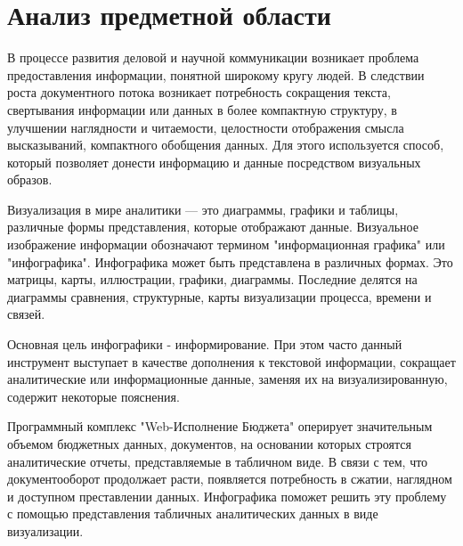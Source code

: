 \documentclass[a4paper]{extarticle}
\numberwithin{equation}{section}
\begin{document}
\newpage
\section{Анализ предметной области}
В процессе развития деловой и научной коммуникации возникает проблема предоставления информации, понятной широкому кругу людей. В следствии роста документного потока возникает потребность сокращения текста, свертывания информации или данных в более компактную структуру, в улучшении наглядности и читаемости, целостности отображения смысла высказываний, компактного обобщения данных. Для этого используется способ, который позволяет донести информацию и данные посредством визуальных образов.\par
Визуализация в мире аналитики — это диаграммы, графики и таблицы, различные формы представления, которые отображают данные. Визуальное изображение информации обозначают термином "информационная графика" или "инфографика". Инфографика может быть представлена в различных формах. Это матрицы, карты, иллюстрации, графики, диаграммы. Последние делятся на диаграммы сравнения, структурные, карты визуализации процесса, времени и связей.\par
Основная цель инфографики - информирование. При этом часто данный инструмент выступает в качестве дополнения к текстовой информации, сокращает аналитические или информационные данные, заменяя их на визуализированную, содержит некоторые пояснения.\par
Программный комплекс "Web-Исполнение Бюджета" оперирует значительным объемом бюджетных данных, документов, на основании которых строятся аналитические отчеты, представляемые в табличном виде. В связи с тем, что документооборот продолжает расти, появляется потребность в сжатии, наглядном и доступном преставлении данных. Инфографика поможет решить эту проблему с помощью представления табличных аналитических данных в виде визуализации.\par
\end{document}

